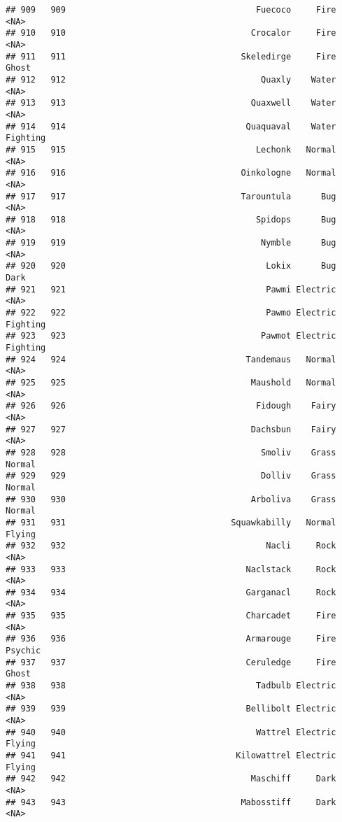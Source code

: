 \documentclass[
]{article}
\begin{document}
\begin{verbatim}
## 909   909                                      Fuecoco     Fire     <NA>
## 910   910                                     Crocalor     Fire     <NA>
## 911   911                                   Skeledirge     Fire    Ghost
## 912   912                                       Quaxly    Water     <NA>
## 913   913                                     Quaxwell    Water     <NA>
## 914   914                                    Quaquaval    Water Fighting
## 915   915                                      Lechonk   Normal     <NA>
## 916   916                                   Oinkologne   Normal     <NA>
## 917   917                                   Tarountula      Bug     <NA>
## 918   918                                      Spidops      Bug     <NA>
## 919   919                                       Nymble      Bug     <NA>
## 920   920                                        Lokix      Bug     Dark
## 921   921                                        Pawmi Electric     <NA>
## 922   922                                        Pawmo Electric Fighting
## 923   923                                       Pawmot Electric Fighting
## 924   924                                    Tandemaus   Normal     <NA>
## 925   925                                     Maushold   Normal     <NA>
## 926   926                                      Fidough    Fairy     <NA>
## 927   927                                     Dachsbun    Fairy     <NA>
## 928   928                                       Smoliv    Grass   Normal
## 929   929                                       Dolliv    Grass   Normal
## 930   930                                     Arboliva    Grass   Normal
## 931   931                                 Squawkabilly   Normal   Flying
## 932   932                                        Nacli     Rock     <NA>
## 933   933                                    Naclstack     Rock     <NA>
## 934   934                                    Garganacl     Rock     <NA>
## 935   935                                    Charcadet     Fire     <NA>
## 936   936                                    Armarouge     Fire  Psychic
## 937   937                                    Ceruledge     Fire    Ghost
## 938   938                                      Tadbulb Electric     <NA>
## 939   939                                    Bellibolt Electric     <NA>
## 940   940                                      Wattrel Electric   Flying
## 941   941                                  Kilowattrel Electric   Flying
## 942   942                                     Maschiff     Dark     <NA>
## 943   943                                   Mabosstiff     Dark     <NA>

\end{verbatim}
\end{document}
